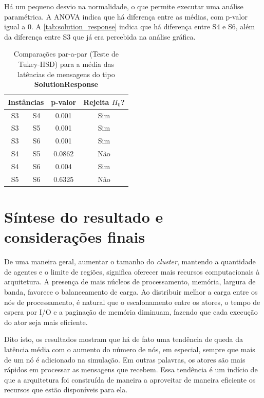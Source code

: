 Há um pequeno desvio na normalidade, o que permite executar uma análise paramétrica. A ANOVA indica que há diferença entre as médias, com p-valor igual a $0$. A \autoref{tab:solution_response} indica que há diferença entre S4 e S6, além da diferença entre S3 que já era percebida na análise gráfica. 

\begin{table}[ht!]
    \centering
    \caption{Comparações par-a-par (Teste de Tukey-HSD) para a média das latências de mensagens do tipo \textbf{SolutionResponse}}
    \begin{tabular}{cccc}
    \toprule
    \multicolumn{2}{c}{\textbf{Instâncias}} & \textbf{p-valor} & \textbf{Rejeita $H_0$?}\\
    \midrule
    S3  &  S4 & 0.001   & Sim  \\
    S3  &  S5 & 0.001   & Sim  \\
    S3  &  S6 & 0.001   & Sim  \\
    S4  &  S5 &  0.0862 & Não \\
    S4  &  S6 &   0.004 & Sim  \\
    S5  &  S6 &  0.6325 & Não \\
     \bottomrule
    \end{tabular}
    \label{tab:solution_response}
\end{table}

\section{Síntese do resultado e considerações finais}
\label{sec:sintese}

De uma maneira geral, aumentar o tamanho do \textit{cluster}, mantendo a quantidade de agentes e o limite de regiões, significa oferecer mais recursos computacionais à arquitetura. A presença de mais núcleos de processamento, memória, largura de banda, favorece o balanceamento de carga. Ao distribuir melhor a carga entre os nós de processamento, é natural que o  escalonamento entre os atores, o tempo de espera por I/O e a paginação de memória diminuam, fazendo que cada execução do ator seja mais eficiente.

Dito isto, os resultados mostram que há de fato uma tendência de queda da latência média com o aumento do número de nós, em especial, sempre que mais de um nó é adicionado na simulação. Em outras palavras, os atores são mais rápidos em processar as mensagens que recebem. Essa tendência é um indício de que a arquitetura foi construída de maneira a aproveitar de maneira eficiente os recursos que estão disponíveis para ela. 

